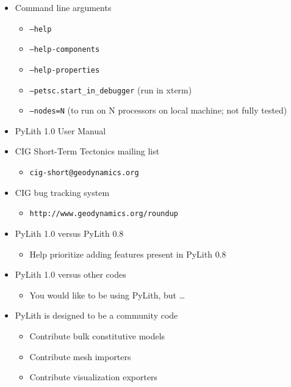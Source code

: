\documentclass[pdftex,cig,slideColor]{pp4slides}
\begin{document}
  \begin{itemize}
  \item Command line arguments
    \begin{itemize}
    \item {\tt --help}
    \item {\tt --help-components}
    \item {\tt --help-properties}
    \item {\tt --petsc.start\_in\_debugger} (run in xterm)
    \item {\tt --nodes=N} (to run on N processors on local machine;
      not fully tested)
    \end{itemize}
  \item PyLith 1.0 User Manual
  \item CIG Short-Term Tectonics mailing list
    \begin{itemize}
    \item {\tt cig-short@geodynamics.org}
    \end{itemize}
  \item CIG bug tracking system
    \begin{itemize}
    \item {\tt http://www.geodynamics.org/roundup}
    \end{itemize}
  \end{itemize}


  \begin{itemize}
  \item PyLith 1.0 versus PyLith 0.8
    \begin{itemize}
    \item Help prioritize adding features present in PyLith 0.8
    \end{itemize}
  \item PyLith 1.0 versus other codes
    \begin{itemize}
    \item You would like to be using PyLith, but \ldots
    \end{itemize}
  \item PyLith is designed to be a community code
    \begin{itemize}
    \item Contribute bulk constitutive models
    \item Contribute mesh importers
    \item Contribute visualization exporters
    \end{itemize}
  \end{itemize}


\end{document}
